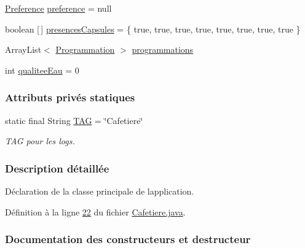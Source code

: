 \begin{DoxyCompactItemize}
\hyperlink{classcom_1_1example_1_1ekawa_1_1_preference}{Preference} \hyperlink{classcom_1_1example_1_1ekawa_1_1_cafetiere_aee3f9b78df63bc8dd73bf564954d51ca}{preference} = null
\item 
boolean \mbox{[}$\,$\mbox{]} \hyperlink{classcom_1_1example_1_1ekawa_1_1_cafetiere_aebaaf300362a258e047ae31b7e56e622}{presences\+Capsules} = \{ true, true, true, true, true, true, true, true \}
\item 
Array\+List$<$ \hyperlink{classcom_1_1example_1_1ekawa_1_1_programmation}{Programmation} $>$ \hyperlink{classcom_1_1example_1_1ekawa_1_1_cafetiere_a987c8e1bcea506b65f4b05f955b3f699}{programmations}
\item 
int \hyperlink{classcom_1_1example_1_1ekawa_1_1_cafetiere_a27aba2ce49934d0bf7b2d2230b3003d7}{qualitee\+Eau} = 0
\end{DoxyCompactItemize}
\subsubsection*{Attributs privés statiques}
\begin{DoxyCompactItemize}
\item 
static final String \hyperlink{classcom_1_1example_1_1ekawa_1_1_cafetiere_aa0c1fd99a2508b06c462aea17034aa91}{T\+AG} = \char`\"{}Cafetiere\char`\"{}
\begin{DoxyCompactList}\small\item\em T\+AG pour les logs. \end{DoxyCompactList}\end{DoxyCompactItemize}


\subsubsection{Description détaillée}
Déclaration de la classe principale de l\textquotesingle{}application. 

Définition à la ligne \hyperlink{_cafetiere_8java_source_l00022}{22} du fichier \hyperlink{_cafetiere_8java_source}{Cafetiere.\+java}.



\subsubsection{Documentation des constructeurs et destructeur}
\mbox{\label{classcom_1_1example_1_1ekawa_1_1_cafetiere_a8a8b762148526c605b13daeaf9d2e7cb}} 
